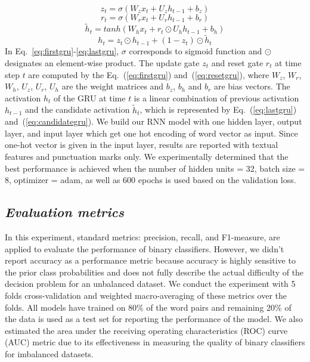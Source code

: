 \documentclass{amia}
\begin{document}
\begin{equation}
z_t = \sigma(W_zx_t + U_zh_{t-1} + b_z)
\label{eq:firstgru}
\end{equation}
\begin{equation}
r_t = \sigma(W_rx_t + U_rh_{t-1} + b_r)
\label{eq:resetgru}
\end{equation}
\begin{equation}
\tilde h_t = tanh(W_hx_t + r_t \odot U_hh_{t-1} + b_h) 
\label{eq:candidategru}
\end{equation}
\begin{equation}
h_t = z_t \odot h_{t-1} + (1-z_t) \odot \tilde h_t
\label{eq:lastgru}
\end{equation}  
In Eq.~\ref{eq:firstgru}-\ref{eq:lastgru}, $\sigma$ corresponds to sigmoid function and $\odot$ designates an element-wise product. The update gate $z_t$ and reset gate $r_t$ at time step $t$ are computed by the Eq.~(\ref{eq:firstgru}) and~(\ref{eq:resetgru}), where $W_z$, $W_r$, $W_h$, $U_z$, $U_r$, $U_h$ are the weight matrices and $b_z$, $b_h$ and $b_r$ are bias vectors. The activation $h_t$ of the GRU at time $t$ is a linear combination of previous activation $h_{t-1}$ and the candidate activation $\tilde h_t$, which is represented by Eq.~(\ref{eq:lastgru}) and~(\ref{eq:candidategru}). We build our RNN model with one hidden layer, output layer, and input layer which get one hot encoding of word vector as input. Since one-hot vector is given in the input layer, results are reported with textual features and punctuation marks only. We experimentally determined that the best performance is achieved when the number of hidden units = 32, batch size = 8, optimizer = adam, as well as 600 epochs is used based on the validation loss.         
  
\subsection*{\textit{Evaluation metrics}}
In this experiment, standard metrics: precision, recall, and F1-measure, are applied to evaluate the performance of binary classifiers\cite{aas1999text}. However, we didn't report accuracy as a performance metric because accuracy is highly sensitive to the prior class probabilities and does not fully describe the actual difficulty of the decision problem for an unbalanced dataset. We conduct the experiment with 5 folds cross-validation and weighted macro-averaging of these metrics over the folds. All models have trained on 80\% of the word pairs and remaining 20\% of the data is used as a test set for reporting the performance of the model. We also estimated the area under the receiving operating characteristics (ROC) curve\cite{kumar2011receiver} (AUC) metric due to its effectiveness in measuring the quality of binary classifiers for imbalanced datasets\cite{hu2015kernelized}. 
\end{document}
